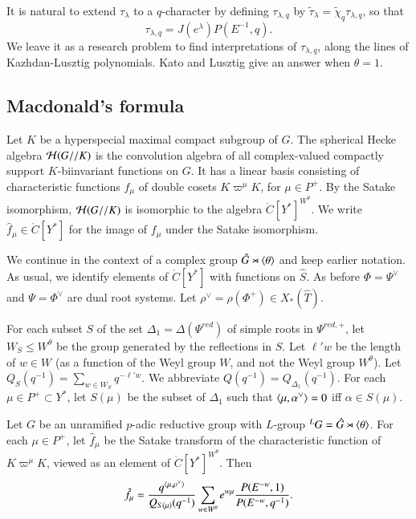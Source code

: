 It is natural to extend $\tau_\lambda$ to a $q$-character by defining
$\tau_{\lambda,q}$ by $\tilde \tau_\lambda = \tilde
\chi_q\tau_{\lambda,q} $, so that
\begin{equation}\label{eqn:tauq}
\tau_{\lambda,q} = J(e^\lambda) P(E^{-1},q).
\end{equation}
We leave it as a research problem to find interpretations of
$\tau_{\lambda,q}$, along the lines of Kazhdan-Lusztig polynomials.
Kato and Lusztig give an answer when $\theta=1$.


\subsection{Macdonald's formula}\label{sec:macdonald}

Let $K$ be a hyperspecial maximal compact subgroup of $G$.  The
spherical Hecke algebra $\mathcal H(G//K)$ is the convolution
algebra of all complex-valued compactly support $K$-biinvariant
functions on $G$.  It has a linear basis consisting of characteristic
functions $f_\mu$ of double cosets $K\varpi^\mu K$, for $\mu\in P^+$.
By the Satake isomorphism, $\mathcal H(G//K)$ is isomorphic to the algebra
$\ring{C}[Y^*]^{W^\theta}$.  We write $\hat f_\mu\in \ring{C}[Y^*]$
for the image of $f_\mu$ under the Satake isomorphism.

We continue in the context of a complex group $\hat G \rtimes
\langle{\theta}\rangle$ and keep earlier notation.  As usual, we identify
elements of $\ring{C}[Y^*]$ with functions on $\hat S$.  As before
$\Phi=\Psi^\vee$ and $\Psi = \Phi^\vee$ are dual root systems.  Let
$\rho^\vee = \rho(\Phi^+)\in X_*(\hat T)$.

For each subset $S$ of the set $\Delta_1=\Delta(\Psi^{red})$ of simple
roots in $\Psi^{red,+}$, let $W_S\le W^\theta$ be the group generated
by the reflections in $S$.  Let $\ell' w$ be the length of $w\in W$
(as a function of the Weyl group $W$, and not the Weyl group
$W^\theta$).  Let $Q_S(q^{-1}) = \sum_{w\in W_S} q^{-\ell'w}$.  We
abbreviate $Q(q^{-1}) = Q_{\Delta_1}(q^{-1})$.  For each $\mu\in
P^+\subset Y^*$, let $S(\mu)$ be the subset of $\Delta_1$ such that
$\langle{\mu,\alpha^\vee}\rangle=0$ iff $\alpha\in S(\mu)$.

\begin{theorem}\label{thm:macdonald}
  Let $G$ be an unramified $p$-adic reductive group with $L$-group
  ${}^LG = \hat G \rtimes \langle{\theta}\rangle$.  For each $\mu\in P^+$, let
  $\hat f_\mu$ be the Satake transform of the characteristic function
  of $K\varpi^\mu K$, viewed as an element of
  $\ring{C}[Y^*]^{W^\theta}$.  Then
\[
\hat f_\mu = \frac{q^{\langle{\mu,\rho^\vee}\rangle}}{ Q_{S(\mu)}(q^{-1})} 
\sum_{w\in W^\theta} e^{w\mu} \frac{P(E^{-w},1)}{P(E^{-w},q^{-1})}.
\]
\end{theorem}

